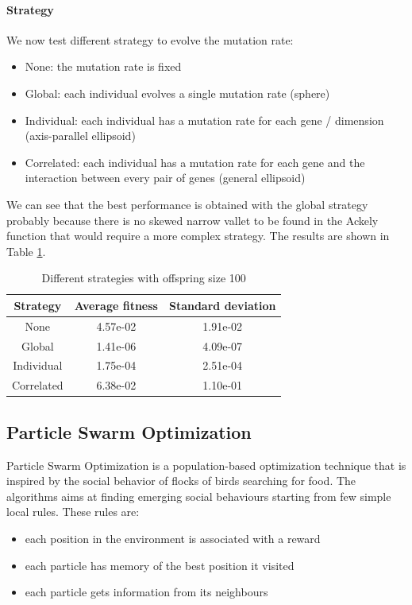 \paragraph*{Strategy}
We now test different strategy to evolve the mutation rate:
\begin{itemize}
    \item None: the mutation rate is fixed
    \item Global: each individual evolves a single mutation rate (sphere)
    \item Individual: each individual has a mutation rate for each gene / dimension (axis-parallel ellipsoid)
    \item Correlated: each individual has a mutation rate for each gene and the interaction between every pair of genes (general ellipsoid)
\end{itemize}
We can see that the best performance is obtained with the global strategy probably because there is no skewed narrow vallet to be found in the Ackely function that would require a more complex strategy. The results are shown in Table \ref{tab:es-strategy}.
\begin{table}[H]
    \centering
    \begin{tabular}{|c|c|c|}
        Strategy   & Average fitness & Standard deviation \\ \hline
        None       & 4.57e-02        & 1.91e-02           \\
        Global     & 1.41e-06        & 4.09e-07           \\
        Individual & 1.75e-04        & 2.51e-04           \\
        Correlated & 6.38e-02        & 1.10e-01           \\
    \end{tabular}
    \caption{Different strategies with offspring size 100}
    \label{tab:es-strategy}
\end{table}

\subsection{Particle Swarm Optimization}
Particle Swarm Optimization is a population-based optimization technique that is inspired by the social behavior of flocks of birds searching for food. The algorithms aims at finding emerging social behaviours starting from few simple local rules. These rules are:
\begin{itemize}
    \item each position in the environment is associated with a reward
    \item each particle has memory of the best position it visited
    \item each particle gets information from its neighbours
\end{itemize}

